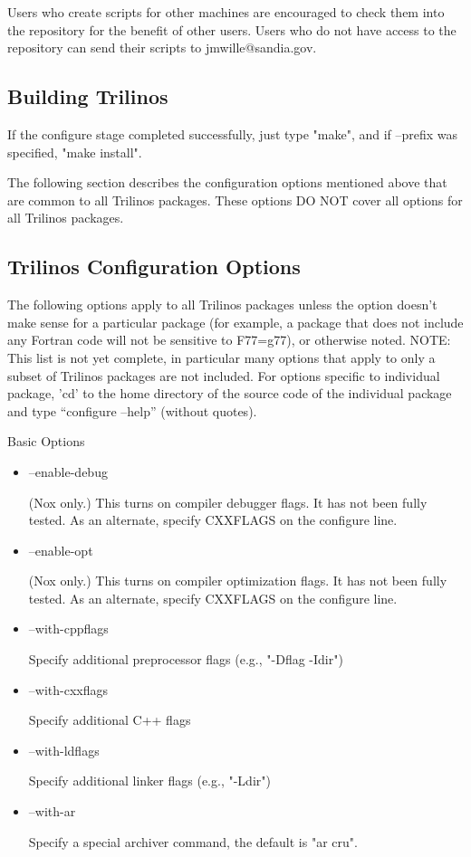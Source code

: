 \documentclass[12pt,relax]{TrilinosDevGuide}
\begin{document}
Users who create scripts for other machines are encouraged to check them into 
the repository for the benefit of other users.  Users who do not have access to
the repository can send their scripts to jmwille@sandia.gov.

\subsection{Building Trilinos}

If the configure stage completed successfully, just type "make", and if 
--prefix was specified, "make install".

The following section describes the configuration options mentioned above that 
are common to all Trilinos packages.  These options DO NOT cover all options 
for all Trilinos packages.

\subsection{Trilinos Configuration Options}

The following options apply to all Trilinos packages unless 
the option doesn't make sense for a particular package (for example, a 
package that does not include any Fortran code will not be sensitive to 
F77=g77), or otherwise noted.  NOTE: This list is not yet complete, in 
particular many options that apply to only a subset of Trilinos packages 
are not included.  For options specific to individual package, 'cd' to the 
home directory of the source code of the individual package and type 
``configure --help'' (without quotes).

Basic Options

\begin{itemize}
\item --enable-debug 

(Nox only.)  This turns on compiler debugger flags. It has 
not been fully tested. As an alternate, specify CXXFLAGS on the 
                 configure line.

\item --enable-opt

(Nox only.)  This turns on compiler optimization flags. It 
has not been fully tested. As an alternate, specify CXXFLAGS on the 
                 configure line. 

\item --with-cppflags 

Specify additional preprocessor flags (e.g., "-Dflag -Idir") 

\item --with-cxxflags 

Specify additional C++ flags 

\item --with-ldflags 

Specify additional linker flags (e.g., "-Ldir") 

\item --with-ar 

Specify a special archiver command, the default is "ar cru". 
\end{itemize}
\end{document}
